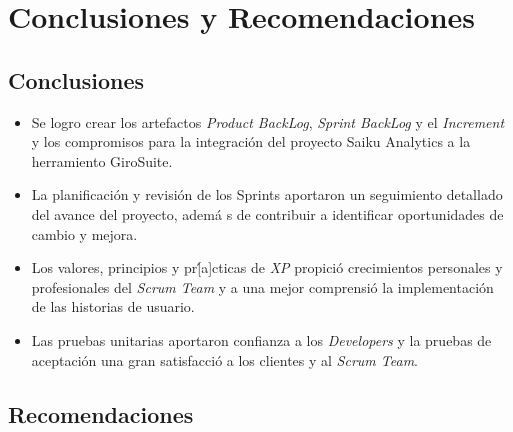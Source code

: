 \chapter{Conclusiones y Recomendaciones} \label{chapter:IV}

\section{Conclusiones}
\begin{itemize}
	\item Se logro crear los artefactos \textit{Product BackLog}, \textit{Sprint BackLog} y el \textit{Increment} y los compromisos para la integraci\'{o}n del proyecto Saiku Analytics a la herramiento GiroSuite.
	\item La planificaci\'{o}n y revisi\'{o}n de los Sprints aportaron un seguimiento detallado del avance del proyecto, adem\'{a} s de contribuir a identificar oportunidades de cambio y mejora.
	\item Los valores, principios y pr\'[a]cticas de \textit{XP} propici\'{o}  crecimientos personales y profesionales del \textit{Scrum Team} y a una mejor comprensi\'{o} la implementaci\'{o}n de las historias de usuario.
	\item Las pruebas unitarias aportaron confianza a los \textit{Developers} y la pruebas de aceptaci\'{o}n una gran satisfacci\'{o} a los clientes y al \textit{Scrum Team}.
\end{itemize}
\section{Recomendaciones}
